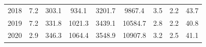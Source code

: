 \documentclass[openany]{book}
\begin{document}
\begin{table}[htbp]
{\begin{tabular}{ccccccccc}
\rowcolor[HTML]{F8F9FA} 
{\color[HTML]{202122} 2018}        & {\color[HTML]{202122} 7.2}                                                                  & {\color[HTML]{202122} 303.1}                                                                        & {\color[HTML]{202122} 934.1}                                                                    & {\color[HTML]{202122} 3201.7}                                                                              & {\color[HTML]{202122} 9867.4}                                                                          & {\color[HTML]{202122} 3.5}                                                                            & {\color[HTML]{202122} 2.2}                                                                               & {\color[HTML]{202122} 43.7}                                                                              \\
\rowcolor[HTML]{F8F9FA} 
{\color[HTML]{202122} 2019}        & {\color[HTML]{202122} 7.2}                                                                  & {\color[HTML]{202122} 331.8}                                                                        & {\color[HTML]{202122} 1021.3}                                                                   & {\color[HTML]{202122} 3439.1}                                                                              & {\color[HTML]{202122} 10584.7}                                                                         & {\color[HTML]{202122} 2.8}                                                                            & {\color[HTML]{202122} 2.2}                                                                               & {\color[HTML]{202122} 40.8}                                                                              \\
\rowcolor[HTML]{F8F9FA} 
{\color[HTML]{202122} 2020}        & {\color[HTML]{202122} 2.9}                                                                  & {\color[HTML]{202122} 346.3}                                                                        & {\color[HTML]{202122} 1064.4}                                                                   & {\color[HTML]{202122} 3548.9}                                                                              & {\color[HTML]{202122} 10907.8}                                                                         & {\color[HTML]{202122} 3.2}                                                                            & {\color[HTML]{202122} 2.5}                                                                               & {\color[HTML]{202122} 41.1}                                                                              \\

\end{tabular}}
\end{table}
\end{document}

